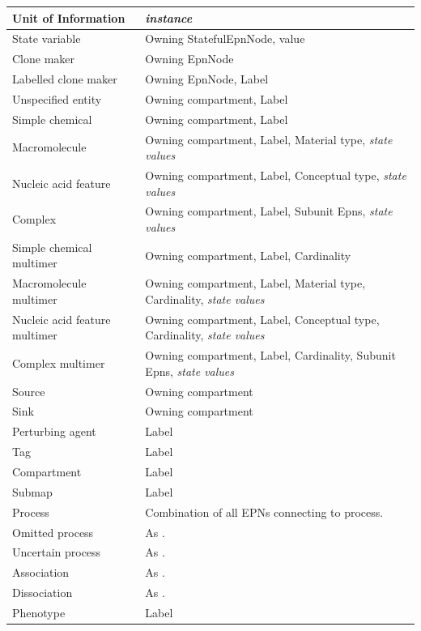 \begin{center}
\begin{small}
\begin{supertabular}{|p{4.5cm}|p{10cm}|}\hline
Unit of Information & \emph{instance} \\\hline
State variable & Owning StatefulEpnNode, value \\\hline
Clone maker & Owning EpnNode \\\hline
Labelled clone maker & Owning EpnNode, Label \\\hline
Unspecified entity & Owning compartment, Label \\\hline
Simple chemical & Owning compartment, Label \\\hline
Macromolecule & Owning compartment, Label, Material type, \emph{state values} \\\hline
Nucleic acid feature & Owning compartment, Label, Conceptual type, \emph{state values} \\\hline
Complex & Owning compartment, Label, Subunit Epns, \emph{state values} \\\hline
Simple chemical multimer & Owning compartment, Label, Cardinality \\\hline
Macromolecule multimer & Owning compartment, Label, Material type, Cardinality, \emph{state values} \\\hline
Nucleic acid feature multimer & Owning compartment, Label, Conceptual type, Cardinality, \emph{state values} \\\hline
Complex multimer & Owning compartment, Label, Cardinality, Subunit Epns, \emph{state values} \\\hline
Source & Owning compartment \\\hline
Sink & Owning compartment \\\hline
Perturbing agent & Label \\\hline
Tag & Label \\\hline
Compartment & Label \\\hline
Submap & Label \\\hline
Process & Combination of all EPNs connecting to process. \\\hline
Omitted process & As . \\\hline
Uncertain process & As . \\\hline
Association & As . \\\hline
Dissociation & As . \\\hline
Phenotype & Label \\\hline
\end{supertabular}
\end{small}
\end{center}

